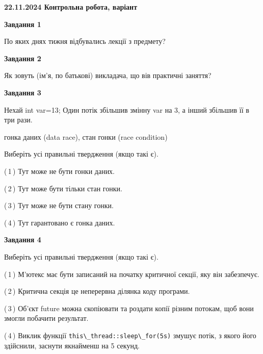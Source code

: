 \documentclass[12pt, ukrainian]{article}
\def\code#1{\Verb!#1!}
\begin{document}
\begin {large}

\textbf{22.11.2024 Контрольна робота, варіант  }\par


{

\begin{center}
\textbf{Завдання 1}
\end{center}

По яких днях тижня відбувались лекції з предмету?


\begin{center}
\textbf{Завдання 2}
\end{center}

Як зовуть (ім'я, по батькові) викладача, що вів практичні заняття?


\begin{center}
\textbf{Завдання 3}
\end{center}

Нехай int var=13; Один потік збільшив змінну var на 3, а інший збільшив її в три рази.

гонка даних (data race), стан гонки (race condition)

Виберіть усі правильні твердження (якщо такі є).\par
\vspace{2mm}
(\,1\,) Тут може не бути гонки даних.%

(\,2\,) Тут може бути тільки стан гонки.%

(\,3\,) Тут може не бути стану гонки.%

(\,4\,) Тут гарантовано є гонка даних.%


\begin{center}
\textbf{Завдання 4}
\end{center}

Виберіть усі правильні твердження (якщо такі є).\par
\vspace{2mm}

(\,1\,) М’ютекс має бути записаний на початку критичної секції, яку він забезпечує.%

(\,2\,) Критична секція це неперервна ділянка коду програми.%

(\,3\,) Об’єкт future можна скопіювати та роздати копії різним потокам, щоб вони змогли побачити результат.%

(\,4\,) Виклик функції \code{this\_thread::sleep\_for(5s)} змушує потік, з якого його здійснили, заснути якнайменш на 5 секунд.%


}
\end{large}
\end{document}
